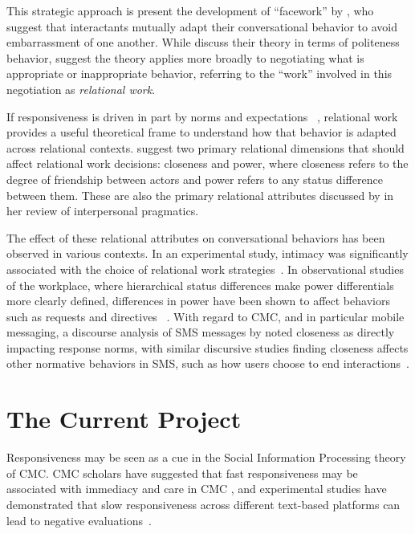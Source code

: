 \documentclass[12pt]{nuthesis}	%
\begin{document}
This strategic approach is present the development of ``facework'' by \citet{brown1987politeness}, who suggest that interactants mutually adapt their conversational behavior to avoid embarrassment of one another. While \citeauthor{brown1987politeness} discuss their theory in terms of politeness behavior, \citet{locher2005politeness} suggest the theory applies more broadly to negotiating what is appropriate or inappropriate behavior, referring to the ``work'' involved in this negotiation as \textit{relational work}.

If responsiveness is driven in part by norms and expectations ~\citep[e.g.,][]{bayer2015connection, church2013s}, relational work provides a useful theoretical frame to understand how that behavior is adapted across relational contexts. \citet{brown1987politeness} suggest two primary relational dimensions that should affect relational work decisions: closeness and power, where closeness refers to the degree of friendship between actors and power refers to any status difference between them. These are also the primary relational attributes discussed by \citet{spencer2011conceptualising} in her review of interpersonal pragmatics.

The effect of these relational attributes on conversational behaviors has been observed in various contexts. In an experimental study, intimacy was significantly associated with the choice of relational work strategies~\citep{meyer2004repairing}. In observational studies of the workplace, where hierarchical status differences make power differentials more clearly defined, differences in power have been shown to affect behaviors such as requests and directives~\citep{craven2010directives,vine2009directives} . With regard to CMC, and in particular mobile messaging, a discourse analysis of SMS messages by \citet{laursen2005please} noted closeness as directly impacting response norms, with similar discursive studies finding closeness affects other normative behaviors in SMS, such as how users choose to end interactions~\citep{spilioti2011beyond}.

\chapter{The Current Project}

Responsiveness may be seen as a cue in the Social Information Processing theory of CMC. CMC scholars have suggested that fast responsiveness may be associated with immediacy and care in CMC \citep{kalman2006pauses,walther1995nonverbal}, and experimental studies have demonstrated that slow responsiveness across different text-based platforms can lead to negative evaluations~\citep{heston2017worth,kalman2011online}.
\end{document}
